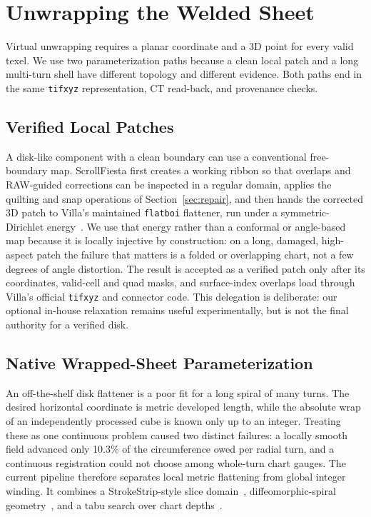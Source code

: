 \section{Unwrapping the Welded Sheet}
\label{sec:unwrap}

Virtual unwrapping requires a planar coordinate and a 3D point for every valid texel. We use two parameterization paths because a clean local patch and a long multi-turn shell have different topology and different evidence. Both paths end in the same \texttt{tifxyz} representation, CT read-back, and provenance checks.

\subsection{Verified Local Patches}

A disk-like component with a clean boundary can use a conventional free-boundary map. ScrollFiesta first creates a working ribbon so that overlaps and RAW-guided corrections can be inspected in a regular domain, applies the quilting and snap operations of Section~\ref{sec:repair}, and then hands the corrected 3D patch to Villa's maintained \texttt{flatboi} flattener, run under a symmetric-Dirichlet energy~\cite{smith2015bijective}. We use that energy rather than a conformal or angle-based map because it is locally injective by construction: on a long, damaged, high-aspect patch the failure that matters is a folded or overlapping chart, not a few degrees of angle distortion. The result is accepted as a verified patch only after its coordinates, valid-cell and quad masks, and surface-index overlaps load through Villa's official \texttt{tifxyz} and connector code. This delegation is deliberate: our optional in-house relaxation remains useful experimentally, but is not the final authority for a verified disk.

\subsection{Native Wrapped-Sheet Parameterization}

An off-the-shelf disk flattener is a poor fit for a long spiral of many turns. The desired horizontal coordinate is metric developed length, while the absolute wrap of an independently processed cube is known only up to an integer. Treating these as one continuous problem caused two distinct failures: a locally smooth field advanced only 10.3\% of the circumference owed per radial turn, and a continuous registration could not choose among whole-turn chart gauges. The current pipeline therefore separates local metric flattening from global integer winding. It combines a StrokeStrip-style slice domain~\cite{pagurek2021strokestrip}, diffeomorphic-spiral geometry~\cite{henderson2026virtually}, and a tabu search over chart depths~\cite{glover1989tabu}.

